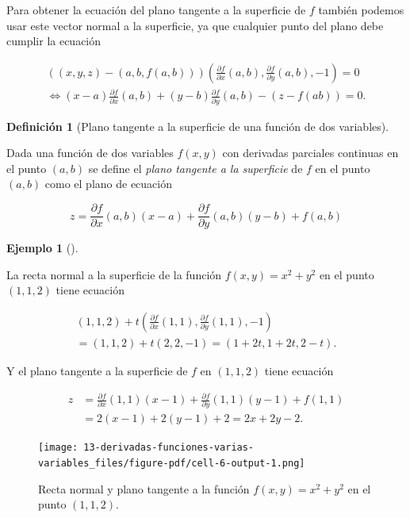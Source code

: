 \documentclass[
  a4paper,
]{scrreport}
\theoremstyle{plain}
\theoremstyle{plain}
\theoremstyle{definition}
\newtheorem{definition}{Definición}[chapter]
\theoremstyle{definition}
\newtheorem{example}{Ejemplo}[chapter]
\theoremstyle{plain}
\theoremstyle{definition}
\theoremstyle{remark}
\begin{document}
Para obtener la ecuación del plano tangente a la superficie de \(f\)
también podemos usar este vector normal a la superficie, ya que
cualquier punto del plano debe cumplir la ecuación

\[
\begin{gathered}
((x,y,z)-(a,b,f(a,b)))\left(\frac{\partial f}{\partial x}(a,b), \frac{\partial f}{\partial y}(a,b), -1\right) = 0 \\
\Leftrightarrow (x-a)\frac{\partial f}{\partial x}(a,b) + (y-b)\frac{\partial f}{\partial y}(a,b) - (z-f(ab)) = 0.
\end{gathered}
\]

\begin{definition}[Plano tangente a la superficie de una función de dos
variables]\protect\hypertarget{def-plano-tangente-superficie}{}\label{def-plano-tangente-superficie}

Dada una función de dos variables \(f(x,y)\) con derivadas parciales
continuas en el punto \((a,b)\) se define el \emph{plano tangente a la
superficie} de \(f\) en el punto \((a,b)\) como el plano de ecuación

\[
z = \frac{\partial f}{\partial x}(a,b)(x-a) + \frac{\partial f}{\partial y}(a,b)(y-b)+f(a,b)
\]

\end{definition}

\begin{example}[]\protect\hypertarget{exm-recta-normal-plano-tangente}{}\label{exm-recta-normal-plano-tangente}

La recta normal a la superficie de la función \(f(x,y)=x^2+y^2\) en el
punto \((1,1,2)\) tiene ecuación

\[
\begin{gathered}
(1,1,2)+ t \left(\frac{\partial f}{\partial x}(1,1), \frac{\partial f}{\partial y}(1,1), -1\right) \\
= (1,1,2)+ t (2,2,-1) = (1+2t,1+2t,2-t).
\end{gathered}
\]

Y el plano tangente a la superficie de \(f\) en \((1,1,2)\) tiene
ecuación

\begin{align*}
z 
&= \frac{\partial f}{\partial x}(1,1)(x-1) + \frac{\partial f}{\partial y}(1,1)(y-1)+f(1,1) \\
&= 2(x-1) + 2(y-1) + 2 =  2x+2y-2.
\end{align*}

\begin{figure}

{\centering \texttt{[image: 13-derivadas-funciones-varias-variables\_files/figure-pdf/cell-6-output-1.png]}

}

\caption{Recta normal y plano tangente a la función \(f(x,y)=x^2+y^2\)
en el punto \((1,1,2)\).}

\end{figure}

\end{example}
\end{document}
